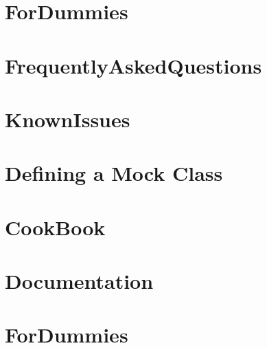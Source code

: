 \documentclass[twoside]{book}
\newcommand{\+}{\discretionary{\mbox{\scriptsize$\hookleftarrow$}}{}{}}
\begin{document}
\chapter{For\+Dummies}
\label{md_vendor_googletest_googlemock_docs__for_dummies}

\chapter{Frequently\+Asked\+Questions}
\label{md_vendor_googletest_googlemock_docs__frequently_asked_questions}

\chapter{Known\+Issues}
\label{md_vendor_googletest_googlemock_docs__known_issues}

\chapter{Defining a Mock Class}
\label{md_vendor_googletest_googlemock_docs_v1_5__cheat_sheet}

\chapter{Cook\+Book}
\label{md_vendor_googletest_googlemock_docs_v1_5__cook_book}

\chapter{Documentation}
\label{md_vendor_googletest_googlemock_docs_v1_5__documentation}

\chapter{For\+Dummies}
\label{md_vendor_googletest_googlemock_docs_v1_5__for_dummies}

\end{document}
